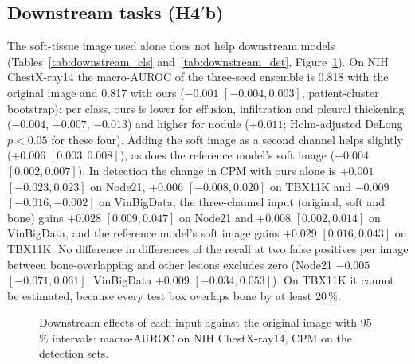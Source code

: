 \subsection{Downstream tasks (\texorpdfstring{H4$'$b}{H4'b})}
The soft-tissue image used alone does not help downstream models (Tables~\ref{tab:downstream_cls} and~\ref{tab:downstream_det},
Figure~\ref{fig:downstream_forest}). On NIH ChestX-ray14 the macro-AUROC of the three-seed ensemble is 0.818 with the original image and
0.817 with ours ($-0.001$ $[-0.004,0.003]$, patient-cluster bootstrap); per class, ours is lower for effusion, infiltration and pleural
thickening ($-0.004$, $-0.007$, $-0.013$) and higher for nodule ($+0.011$; Holm-adjusted DeLong $p<0.05$ for these four). Adding the soft image
as a second channel helps slightly ($+0.006$ $[0.003,0.008]$), as does the reference model's soft image ($+0.004$ $[0.002,0.007]$). In
detection the change in CPM with ours alone is $+0.001$ $[-0.023,0.023]$ on Node21, $+0.006$ $[-0.008,0.020]$ on TBX11K and $-0.009$
$[-0.016,-0.002]$ on VinBigData; the three-channel input (original, soft and bone) gains $+0.028$ $[0.009,0.047]$ on Node21 and $+0.008$
$[0.002,0.014]$ on VinBigData, and the reference model's soft image gains $+0.029$ $[0.016,0.043]$ on TBX11K. No difference in differences of
the recall at two false positives per image between bone-overlapping and other lesions excludes zero (Node21 $-0.005$ $[-0.071,0.061]$,
VinBigData $+0.009$ $[-0.034,0.053]$). On TBX11K it cannot be estimated, because every test box overlaps bone by at least 20\,\%.
\begin{table}[htbp]
\centering\small
\caption{Downstream classification on NIH ChestX-ray14: macro-AUROC of the three-seed ensemble, per-seed mean $\pm$ SD and the difference to
the original image (patient-cluster bootstrap).}
\label{tab:downstream_cls}
\end{table}
\begin{table}[htbp]
\centering\small
\caption{Downstream detection on Node21, TBX11K and VinBigData: CPM and mAP@50 (mean $\pm$ SD over three seeds), differences to the original
image and the difference in differences (DiD) of recall at two false positives per image (image bootstrap). both: the original, soft-tissue
and bone images as three channels.}
\label{tab:downstream_det}
\end{table}
\begin{figure}[htbp]
\centering
{}
\caption{Downstream effects of each input against the original image with 95\,\% intervals: macro-AUROC on NIH ChestX-ray14, CPM on the
detection sets.}
\label{fig:downstream_forest}
\end{figure}

